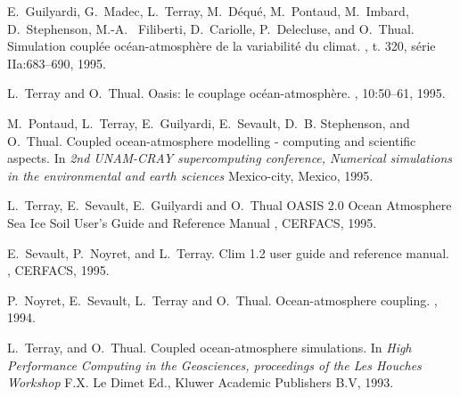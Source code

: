 \begin{thebibliography}{10}
E.~Guilyardi, G.~Madec, L.~Terray, M.~D\'equ\'e, M.~Pontaud, M.~Imbard, D.~Stephenson, M.-A. ~Filiberti, D.~Cariolle, P.~Delecluse, and O.~Thual. 
\newblock Simulation coupl\'ee oc\'ean-atmosph\`ere de la variabilit\'e du climat.
, t. 320, s\'erie IIa:683--690, 1995. 

L.~Terray and O.~Thual.
\newblock Oasis: le couplage oc\'ean-atmosph\`ere.
, 10:50--61, 1995.

M.~Pontaud, L.~Terray, E.~Guilyardi, E.~Sevault, D.~B. Stephenson, and
  O.~Thual.
\newblock Coupled ocean-atmosphere modelling - computing and scientific
  aspects.
\newblock In {\em 2nd UNAM-CRAY supercomputing conference, Numerical
  simulations in the environmental and earth sciences}
\newblock Mexico-city, Mexico, 1995.

L.~Terray, E.~Sevault, E.~Guilyardi and O.~Thual
\newblock OASIS 2.0 Ocean Atmosphere Sea Ice Soil User's Guide and Reference Manual
, CERFACS, 1995.

E.~Sevault, P.~Noyret, and L.~Terray.
\newblock Clim 1.2 user guide and reference manual.
, CERFACS, 1995.

P.~Noyret, E.~Sevault, L.~Terray and O.~Thual.
\newblock Ocean-atmosphere coupling. 
,
1994.

L.~Terray, and O.~Thual.
\newblock Coupled ocean-atmosphere simulations. 
\newblock In {\em High Performance Computing in the Geosciences,
proceedings of the Les Houches Workshop}
\newblock F.X. Le Dimet Ed., Kluwer Academic Publishers B.V, 1993.




\end{thebibliography}

